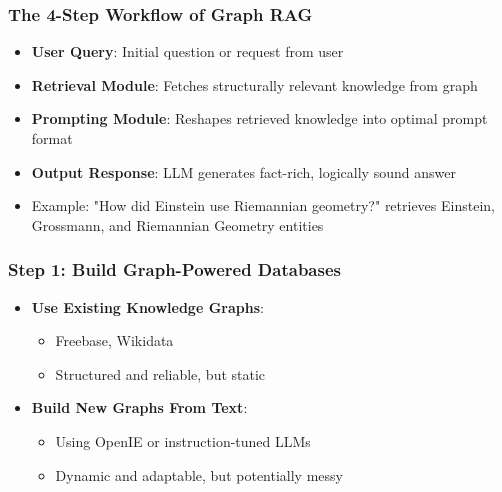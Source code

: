 \begin{frame}[fragile]\frametitle{The 4-Step Workflow of Graph RAG}
      \begin{itemize}
        \item \textbf{User Query}: Initial question or request from user
        \item \textbf{Retrieval Module}: Fetches structurally relevant knowledge from graph
        \item \textbf{Prompting Module}: Reshapes retrieved knowledge into optimal prompt format
        \item \textbf{Output Response}: LLM generates fact-rich, logically sound answer
        \item Example: "How did Einstein use Riemannian geometry?" retrieves Einstein, Grossmann, and Riemannian Geometry entities
      \end{itemize}
\end{frame}

\begin{frame}[fragile]\frametitle{Step 1: Build Graph-Powered Databases}
      \begin{itemize}
        \item \textbf{Use Existing Knowledge Graphs}:
          \begin{itemize}
            \item Freebase, Wikidata
            \item Structured and reliable, but static
          \end{itemize}
        \item \textbf{Build New Graphs From Text}:
          \begin{itemize}
            \item Using OpenIE or instruction-tuned LLMs
            \item Dynamic and adaptable, but potentially messy
          \end{itemize}
      \end{itemize}
\end{frame}

